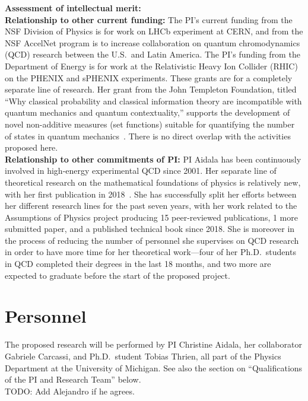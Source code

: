 \noindent
\textbf{Assessment of intellectual merit:} \\

\noindent
\textbf{Relationship to other current funding:} The PI's current funding from the NSF Division of Physics is for work on LHCb experiment at CERN, and from the NSF AccelNet program is to increase collaboration on quantum chromodynamics (QCD) research between the U.S.~and Latin America.  The PI's funding from the Department of Energy is for work at the Relativistic Heavy Ion Collider (RHIC) on the PHENIX and sPHENIX experiments.  These grants are for a completely separate line of research. Her grant from the John Templeton Foundation, titled ``Why classical probability and classical information theory are incompatible with quantum mechanics and quantum contextuality,'' supports the development of novel non-additive measures (set functions) suitable for quantifying the number of states in quantum mechanics~\cite{aop-nonaddmeas}.  There is no direct overlap with the activities proposed here.  \\

\noindent
\textbf{Relationship to other commitments of PI:} PI Aidala has been continuously involved in high-energy experimental QCD since 2001.  Her separate line of theoretical research on the mathematical foundations of physics is relatively new, with her first publication in 2018~\cite{aop-phys-blueprint}. She has successfully split her efforts between her different research lines for the past seven years, with her work related to the Assumptions of Physics project producing 15 peer-reviewed publications, 1 more submitted paper, and a published technical book since 2018.  She is moreover in the process of reducing the number of personnel she supervises on QCD research in order to have more time for her theoretical work---four of her Ph.D.~students in QCD completed their degrees in the last 18 months, and two more are expected to graduate before the start of the proposed project.  




\section{Personnel}
The proposed research will be performed by PI Christine Aidala, her collaborator Gabriele Carcassi, and Ph.D.~student Tobias Thrien, all part of the Physics Department at the University of Michigan.  See also the section on ``Qualifications of the PI and Research Team'' below.  \\
TODO: Add Alejandro if he agrees.

